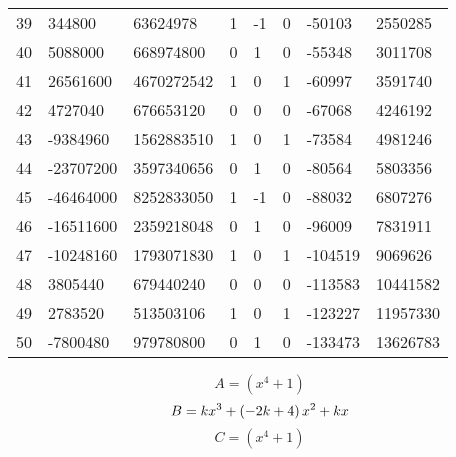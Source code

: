\documentclass{amsart}
\begin{document}
\begin{longtable}{|l|l|l|lllll|}
39&344800&63624978&1&-1&0&-50103&2550285\\
40&5088000&668974800&0&1&0&-55348&3011708\\
41&26561600&4670272542&1&0&1&-60997&3591740\\
42&4727040&676653120&0&0&0&-67068&4246192\\
43&-9384960&1562883510&1&0&1&-73584&4981246\\
44&-23707200&3597340656&0&1&0&-80564&5803356\\
45&-46464000&8252833050&1&-1&0&-88032&6807276\\
46&-16511600&2359218048&0&1&0&-96009&7831911\\
47&-10248160&1793071830&1&0&1&-104519&9069626\\
48&3805440&679440240&0&0&0&-113583&10441582\\
49&2783520&513503106&1&0&1&-123227&11957330\\
50&-7800480&979780800&0&1&0&-133473&13626783\\
\hline
\end{longtable}
$$A=(x^4
 + 1)$$
$$B=k\*x^3
 + \left(-2\*k
 + 4\right) \*x^2
 + k\*x$$
$$C=(x^4
 + 1)$$
\end{document}
